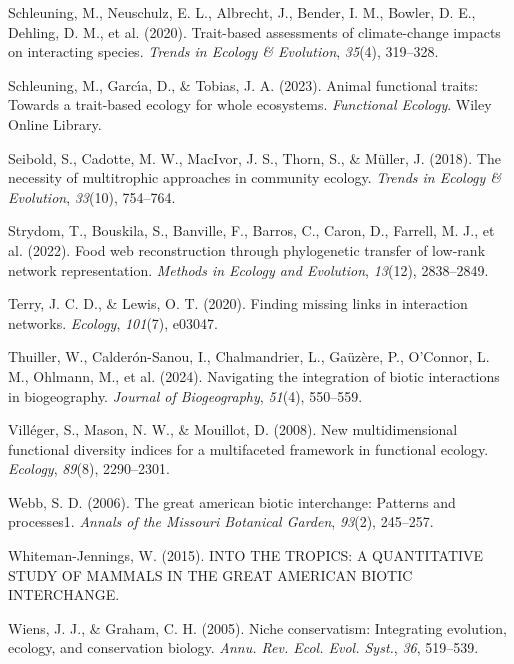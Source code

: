 \documentclass[
]{agujournal2019}
\newlength{\cslhangindent}
\newenvironment{CSLReferences}[2] %
 {\begin{list}{}{%
  \setlength{\itemindent}{0pt}
  \setlength{\leftmargin}{0pt}
  \setlength{\parsep}{0pt}
  \ifodd #1
   \setlength{\leftmargin}{\cslhangindent}
   \setlength{\itemindent}{-1\cslhangindent}
  \fi
  \setlength{\itemsep}{#2\baselineskip}}}
 {\end{list}}
\begin{document}
\begin{CSLReferences}{1}{0}
Schleuning, M., Neuschulz, E. L., Albrecht, J., Bender, I. M., Bowler,
D. E., Dehling, D. M., et al. (2020). Trait-based assessments of
climate-change impacts on interacting species. \emph{Trends in Ecology
\& Evolution}, \emph{35}(4), 319--328.

Schleuning, M., Garcı́a, D., \& Tobias, J. A. (2023). Animal functional
traits: Towards a trait-based ecology for whole ecosystems.
\emph{Functional Ecology}. Wiley Online Library.

Seibold, S., Cadotte, M. W., MacIvor, J. S., Thorn, S., \& Müller, J.
(2018). The necessity of multitrophic approaches in community ecology.
\emph{Trends in Ecology \& Evolution}, \emph{33}(10), 754--764.

Strydom, T., Bouskila, S., Banville, F., Barros, C., Caron, D., Farrell,
M. J., et al. (2022). Food web reconstruction through phylogenetic
transfer of low-rank network representation. \emph{Methods in Ecology
and Evolution}, \emph{13}(12), 2838--2849.

Terry, J. C. D., \& Lewis, O. T. (2020). Finding missing links in
interaction networks. \emph{Ecology}, \emph{101}(7), e03047.

Thuiller, W., Calderón-Sanou, I., Chalmandrier, L., Gaüzère, P.,
O'Connor, L. M., Ohlmann, M., et al. (2024). Navigating the integration
of biotic interactions in biogeography. \emph{Journal of Biogeography},
\emph{51}(4), 550--559.

Villéger, S., Mason, N. W., \& Mouillot, D. (2008). New multidimensional
functional diversity indices for a multifaceted framework in functional
ecology. \emph{Ecology}, \emph{89}(8), 2290--2301.

Webb, S. D. (2006). The great american biotic interchange: Patterns and
processes1. \emph{Annals of the Missouri Botanical Garden},
\emph{93}(2), 245--257.

Whiteman-Jennings, W. (2015). INTO THE TROPICS: A QUANTITATIVE STUDY OF
MAMMALS IN THE GREAT AMERICAN BIOTIC INTERCHANGE.

Wiens, J. J., \& Graham, C. H. (2005). Niche conservatism: Integrating
evolution, ecology, and conservation biology. \emph{Annu. Rev. Ecol.
Evol. Syst.}, \emph{36}, 519--539.


\end{CSLReferences}
\end{document}
